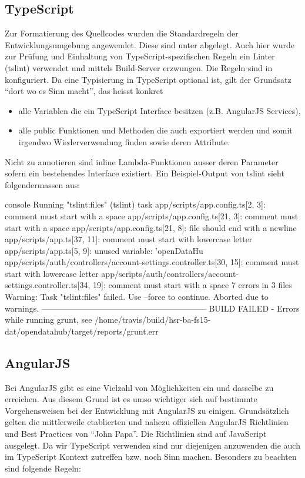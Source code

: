 \subsection{TypeScript}
Zur Formatierung des Quellcodes wurden die Standardregeln der Entwicklungsumgebung angewendet. Diese sind unter  abgelegt. Auch hier wurde zur Prüfung und Einhaltung von TypeScript-spezifischen Regeln ein Linter (tslint) verwendet und mittels Build-Server erzwungen. Die Regeln sind in  konfiguriert. Da eine Typisierung in TypeScript optional ist, gilt der Grundsatz ``dort wo es Sinn macht'', das heisst konkret
\begin{itemize}
\item alle Variablen die ein TypeScript Interface besitzen (z.B. AngularJS Services),
\item alle public Funktionen und Methoden die auch exportiert werden und somit irgendwo Wiederverwendung finden sowie deren Attribute.
\end{itemize}

Nicht zu annotieren sind inline Lambda-Funktionen ausser deren Parameter sofern ein bestehendes Interface existiert. Ein Beispiel-Output von tslint sieht folgendermassen aus:

\begin{src}{console}
Running "tslint:files" (tslint) task
app/scripts/app.config.ts[2, 3]: comment must start with a space
app/scripts/app.config.ts[21, 3]: comment must start with a space
app/scripts/app.config.ts[21, 8]: file should end with a newline
app/scripts/app.ts[37, 11]: comment must start with lowercase letter
app/scripts/app.ts[5, 9]: unused variable: 'openDataHu
app/scripts/auth/controllers/account-settings.controller.ts[30, 15]: comment must start with lowercase letter
app/scripts/auth/controllers/account-settings.controller.ts[34, 19]: comment must start with a space
7 errors in 3 files
Warning: Task "tslint:files" failed. Use --force to continue.
Aborted due to warnings.
------------------------------------------------------------
BUILD FAILED - Errors while running grunt, see /home/travis/build/hsr-ba-fs15-dat/opendatahub/target/reports/grunt.err
\end{src}


\subsection{AngularJS}
Bei AngularJS gibt es eine Vielzahl von Möglichkeiten ein und dasselbe zu erreichen. Aus diesem Grund ist es umso wichtiger sich auf bestimmte Vorgehensweisen bei der Entwicklung mit AngularJS zu einigen. Grundsätzlich gelten die mittlerweile etablierten und nahezu offiziellen AngularJS Richtlinien und Best Practices von ``John Papa''\cite{angular-styleguide}. Die Richtlinien sind auf JavaScript ausgelegt. Da wir TypeScript verwenden sind nur diejenigen anzuwenden die auch im TypeScript Kontext zutreffen bzw. noch Sinn machen. Besonders zu beachten sind folgende Regeln:

